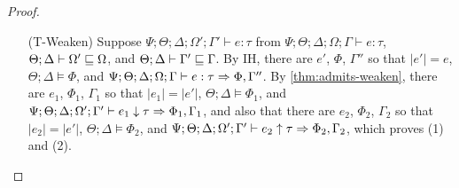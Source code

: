 \begin{proof}
\begin{itemize}
  \item[(T-Weaken)] Suppose $\Psi ; \Theta ; \Delta ; \Omega' ; \Gamma' \vdash e : \tau$ from $\Psi ; \Theta ; \Delta ; \Omega ; \Gamma \vdash e : \tau$, $\Theta ; \Delta \vdash \Omega' \sqsubseteq \Omega$, and $\Theta ; \Delta \vdash \Gamma' \sqsubseteq \Gamma$. By IH, there are $e'$, $\Phi$, $\Gamma''$ so that $|e'| = e$, $\Theta ; \Delta \vDash \Phi$, and $\Psi ; \Theta ; \Delta ; \Omega ; \Gamma \vdash e : \tau \Rightarrow \Phi, \Gamma''$. By \autoref{thm:admits-weaken}, there are $e_1$, $\Phi_1$, $\Gamma_1$ so that $|e_1| = |e'|$, $\Theta ; \Delta \vDash \Phi_1$, and $\Psi ; \Theta ; \Delta ; \Omega' ; \Gamma' \vdash e_1 \downarrow \tau \Rightarrow \Phi_1,\Gamma_1$, and also that there are $e_2$, $\Phi_2$, $\Gamma_2$ so that $|e_2| = |e'|$, $\Theta ; \Delta \vDash \Phi_2$, and $\Psi ; \Theta ; \Delta ; \Omega' ; \Gamma' \vdash e_2 \uparrow \tau \Rightarrow \Phi_2,\Gamma_2$, which proves (1) and (2).
 
\end{itemize}

\end{proof}